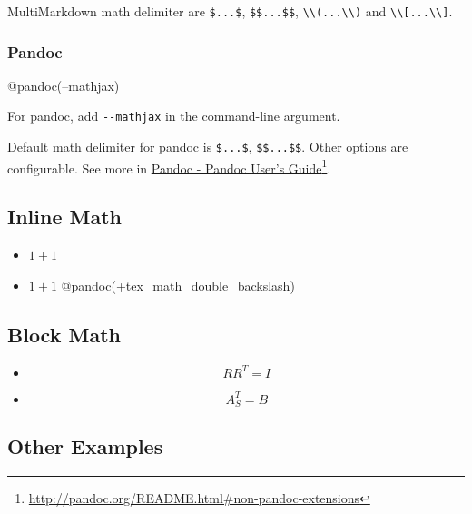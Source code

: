 MultiMarkdown math delimiter are \texttt{\$...\$}, \texttt{\$\$...\$\$}, \texttt{\textbackslash{}\textbackslash{}(...\textbackslash{}\textbackslash{})} and \texttt{\textbackslash{}\textbackslash{}[...\textbackslash{}\textbackslash{}]}.

\subsubsection{Pandoc}
\label{pandoc}

@pandoc(--mathjax)

For pandoc, add \texttt{-{}-mathjax} in the command-line argument.

Default math delimiter for pandoc is \texttt{\$...\$}, \texttt{\$\$...\$\$}. Other options are configurable. See more in \href{http://pandoc.org/README.html#non-pandoc-extensions}{Pandoc - Pandoc User’s Guide}\footnote{\href{http://pandoc.org/README.html\#non-pandoc-extensions}{http:/\slash pandoc.org\slash README.html\#non-pandoc-extensions}}.

\subsection{Inline Math}
\label{inlinemath}

\begin{itemize}
\item $1+1$

\item $1 + 1$ @pandoc(+tex\_math\_double\_backslash)

\end{itemize}

\subsection{Block Math}
\label{blockmath}

\begin{itemize}
\item $$R R^T = I$$

\item \[A^T_S = B\]

\end{itemize}

\subsection{Other Examples}
\label{otherexamples}

